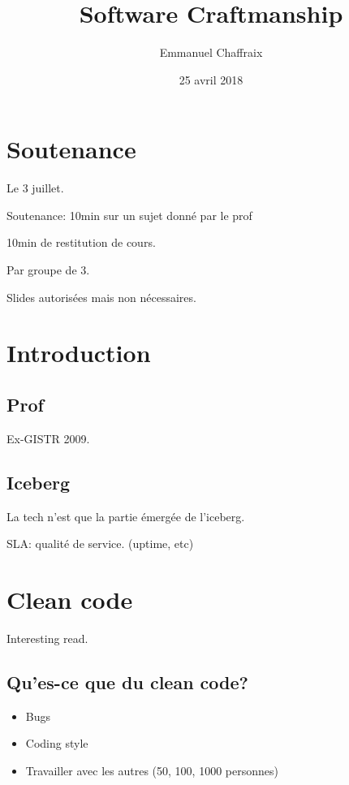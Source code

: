\documentclass[a4paper,11pt]{article}
\title{Software Craftmanship}
\author{Emmanuel Chaffraix}
\date{25 avril 2018}
\begin{document}
\maketitle
\tableofcontents

\newpage

\section{Soutenance}

Le 3 juillet.

Soutenance: 10min sur un sujet donné par le prof

10min de restitution de cours.

Par groupe de 3.

Slides autorisées mais non nécessaires.

\section{Introduction}

\subsection{Prof}

Ex-GISTR 2009.

\subsection{Iceberg}

La tech n'est que la partie émergée de l'iceberg.

SLA: qualité de service. (uptime, etc)

\section{Clean code}

Interesting read.

\subsection{Qu'es-ce que du clean code?}

\begin{itemize}
\item Bugs
\item Coding style
\item Travailler avec les autres (50, 100, 1000 personnes)
\end{itemize}
\end{document}
